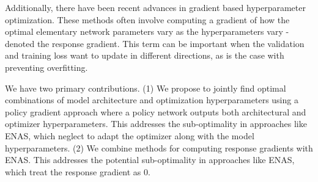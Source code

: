 \documentclass{article}
\begin{document}
Additionally, there have been recent advances in gradient based hyperparameter optimization.
These methods often involve computing a gradient of how the optimal elementary network parameters vary as the hyperparameters vary - denoted the response gradient.
This term can be important when the validation and training loss want to update in different directions, as is the case with preventing overfitting.

We have two primary contributions.
(1) We propose to jointly find optimal combinations of model architecture and optimization hyperparameters using a policy gradient approach where a policy network outputs both architectural and optimizer hyperparameters.
This addresses the sub-optimality in approaches like ENAS, which neglect to adapt the optimizer along with the model hyperparameters.
(2) We combine methods for computing response gradients with ENAS.
This addresses the potential sub-optimality in approaches like ENAS, which treat the response gradient as 0.
\end{document}
